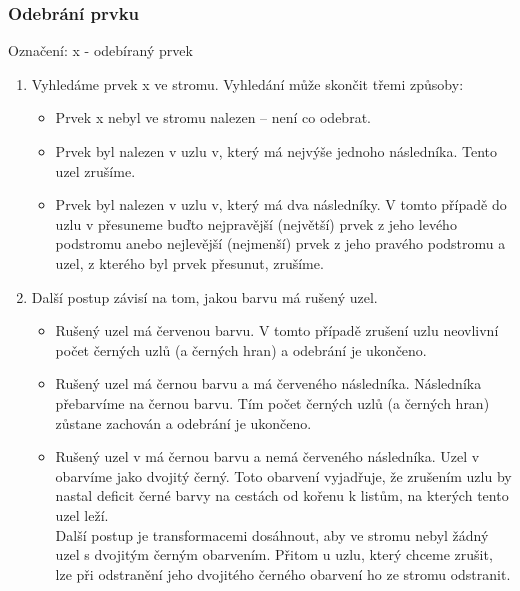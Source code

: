 \documentclass[10pt,a4paper]{article}
\begin{document}
\subsubsection{Odebrání prvku}
Označení: x - odebíraný prvek
\begin{enumerate}
	\item Vyhledáme prvek x ve stromu. Vyhledání může skončit třemi způsoby:
	\begin{itemize}
		\item Prvek x nebyl ve stromu nalezen – není co odebrat.
		\item Prvek byl nalezen v uzlu v, který má nejvýše jednoho následníka. Tento uzel zrušíme.
		\item Prvek byl nalezen v uzlu v, který má dva následníky. V tomto případě do uzlu v přesuneme buďto nejpravější (největší) prvek z jeho levého podstromu anebo nejlevější (nejmenší) prvek z jeho pravého podstromu a uzel, z kterého byl prvek přesunut, zrušíme.
	\end{itemize}
	\item Další postup závisí na tom, jakou barvu má rušený uzel.
	\begin{itemize}
		\item Rušený uzel má červenou barvu. V tomto případě zrušení uzlu neovlivní počet černých uzlů (a černých hran) a odebrání je ukončeno.
		\item Rušený uzel má černou barvu a má červeného následníka. Následníka přebarvíme na černou barvu. Tím počet černých uzlů (a černých hran) zůstane zachován a odebrání je ukončeno.
		\item Rušený uzel v má černou barvu a nemá červeného následníka. Uzel v obarvíme jako dvojitý černý. Toto obarvení vyjadřuje, že zrušením uzlu by nastal deficit černé barvy na cestách od kořenu k listům, na kterých tento uzel leží. \\
		Další postup je transformacemi dosáhnout, aby ve stromu nebyl žádný uzel s dvojitým černým obarvením. Přitom u uzlu, který chceme zrušit, lze při odstranění jeho dvojitého černého obarvení ho ze stromu odstranit.
	\end{itemize}
\end{enumerate}
\end{document}
